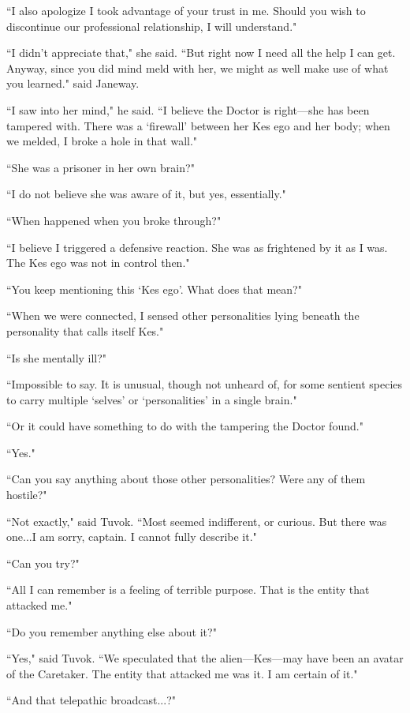\documentclass[twoside,letterpaper,12pt]{memoir}
\begin{document}
``I also apologize I took advantage of your trust in me. Should you wish to discontinue our professional relationship, I will understand." 

``I didn't appreciate that," she said. ``But right now I need all the help I can get. Anyway, since you did mind meld with her, we might as well make use of what you learned." said Janeway. 

``I saw into her mind," he said. ``I believe the Doctor is right---she has been tampered with. There was a `firewall' between her Kes ego and her body; when we melded, I broke a hole in that wall." 

``She was a prisoner in her own brain?" 

``I do not believe she was aware of it, but yes, essentially." 

``When happened when you broke through?" 

``I believe I triggered a defensive reaction. She was as frightened by it as I was. The Kes ego was not in control then." 

``You keep mentioning this `Kes ego'. What does that mean?" 

``When we were connected, I sensed other personalities lying beneath the personality that calls itself Kes." 

``Is she mentally ill?" 

``Impossible to say. It is unusual, though not unheard of, for some sentient species to carry multiple `selves' or `personalities' in a single brain." 

``Or it could have something to do with the tampering the Doctor found." 

``Yes." 

``Can you say anything about those other personalities? Were any of them hostile?" 

``Not exactly," said Tuvok. ``Most seemed indifferent, or curious. But there was one...I am sorry, captain. I cannot fully describe it." 

``Can you try?" 

``All I can remember is a feeling of terrible purpose. That is the entity that attacked me." 

``Do you remember anything else about it?" 

``Yes," said Tuvok. ``We speculated that the alien---Kes---may have been an avatar of the Caretaker. The entity that attacked me was it. I am certain of it." 

``And that telepathic broadcast...?" 
\end{document}
